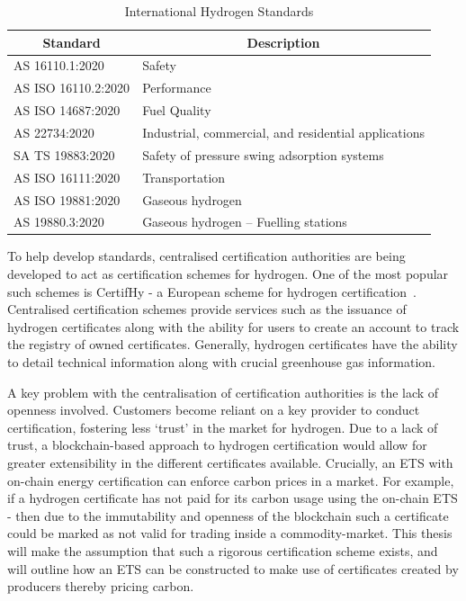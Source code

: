 \begin{table}[ht]
    \centering
    \begin{tabular}{|l|l|}
        \hline
        \multicolumn{1}{|c|}{\textbf{Standard}} & \multicolumn{1}{c|}{\textbf{Description}}            \\ \hline
        AS 16110.1:2020                         & Safety                                               \\ \hline
        AS ISO 16110.2:2020                     & Performance                                          \\ \hline
        AS ISO 14687:2020                       & Fuel Quality                                         \\ \hline
        AS 22734:2020                           & Industrial, commercial, and residential applications \\ \hline
        SA TS 19883:2020                        & Safety of pressure swing adsorption systems          \\ \hline
        AS ISO 16111:2020                       & Transportation                                       \\ \hline
        AS ISO 19881:2020                       & Gaseous hydrogen                                     \\ \hline
        AS 19880.3:2020                         & Gaseous hydrogen – Fuelling stations                 \\ \hline
    \end{tabular}
    \caption{International Hydrogen Standards}
    \label{tab:standards}
\end{table}

To help develop standards, centralised certification authorities
are being developed to act as certification schemes for hydrogen.
One of the most popular such schemes is CertifHy - a European
scheme for hydrogen certification~\cite{certifhy}. Centralised
certification schemes provide services such as the issuance of
hydrogen certificates along with the ability for users to create
an account to track the registry of owned certificates. Generally,
hydrogen certificates have the ability to detail technical information
along with crucial greenhouse gas information.

A key problem with the centralisation of certification authorities is the
lack of openness involved. Customers become reliant on a key provider to
conduct certification, fostering less `trust' in the market for hydrogen.
Due to a lack of trust, a blockchain-based approach to hydrogen
certification would allow for greater extensibility in the different
certificates available. Crucially, an ETS with on-chain energy
certification can enforce carbon prices in a market. For example,
if a hydrogen certificate has not paid for its carbon usage using
the on-chain ETS - then due to the immutability and openness of the
blockchain such a certificate could be marked as not valid for
trading inside a commodity-market. This thesis will make the
assumption that such a rigorous certification scheme exists, and will
outline how an ETS can be constructed to
make use of certificates created by producers thereby pricing carbon.

